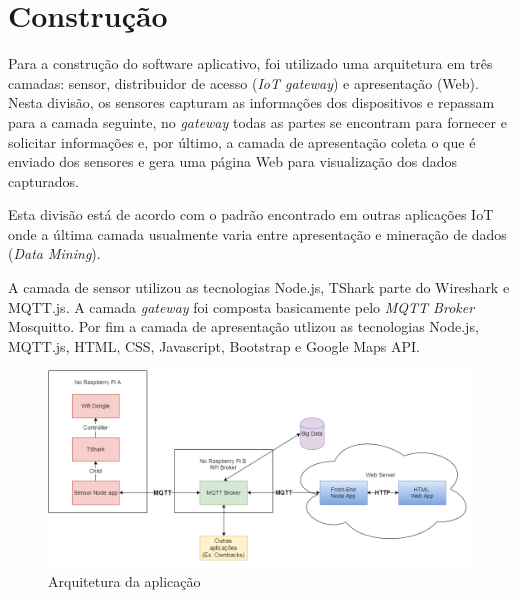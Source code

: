 \chapter{Construção}
\label{chap:Construcao}

Para a construção do software aplicativo, foi utilizado uma arquitetura em
três camadas: sensor, distribuidor de acesso (\emph{IoT gateway}) e apresentação
(Web). Nesta divisão, os sensores capturam as informações dos dispositivos
e repassam para a camada seguinte, no \emph{gateway} todas as partes se
encontram para fornecer e solicitar informações e, por último, a camada de
apresentação coleta o que é enviado dos sensores e gera uma página Web
para visualização dos dados capturados.

Esta divisão está de acordo com o padrão encontrado em outras aplicações
IoT onde a última camada usualmente varia entre apresentação e mineração
de dados (\emph{Data Mining}).

A camada de sensor utilizou as tecnologias Node.js, TShark parte
do Wireshark e MQTT.js. A camada \emph{gateway} foi composta
basicamente pelo \emph{MQTT Broker} Mosquitto. Por fim a camada de
apresentação utlizou as tecnologias Node.js, MQTT.js, HTML,
CSS, Javascript, Bootstrap e Google Maps API.

\begin{figure}[htb]
	\caption{\label{fig-arq-app}Arquitetura da aplicação}
	\begin{center}
		\includegraphics[width=1\textwidth]{050-construcao/esquema-proj.png}
	\end{center}
\end{figure}
